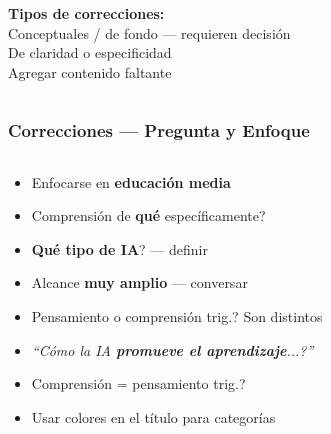 \documentclass[11pt, aspectratio=169, spanish]{beamer}
\newcommand{\semOK}{\textcolor{VerdeOk}{\faCheckCircle}}
\newcommand{\semWA}{\textcolor{AmarilloAv}{\faExclamationCircle}}
\newcommand{\semNO}{\textcolor{RojoAlerta}{\faTimesCircle}}
\begin{document}
\begin{frame}[plain]
\begin{columns}[T]
\vspace{0.12cm}

\begin{tcolorbox}[colback=AzulInfo!7, colframe=AzulInfo!50, arc=2mm]
{\footnotesize\faLightbulb\quad\textbf{Tipos de correcciones:}\\[0.06cm]
\semNO\; {\small Conceptuales / de fondo — requieren decisión}\\
\semWA\; {\small De claridad o especificidad}\\
\semOK\; {\small Agregar contenido faltante}}
\end{tcolorbox}

\end{columns}
\end{frame}

\begin{frame}[plain]
\frametitle{\faFire\quad Correcciones — Pregunta y Enfoque}
\vspace{0pt}

\begin{columns}[T]

\begin{tcolorbox}[colback=RojoAlerta!5, colframe=RojoAlerta!55, arc=2mm,
  nobeforeafter, top=2pt, bottom=2pt,
  title={\footnotesize\textbf{Comentarios de la Dra. Santacruz}}]
{\scriptsize
\begin{itemize}[leftmargin=*, itemsep=1pt]
  \item \colorbox{RojoAlerta!15}{\textcolor{RojoAlerta}{}}\; Enfocarse en \textbf{educación media}
  \item \colorbox{RojoAlerta!15}{\textcolor{RojoAlerta}{}}\; \textquestiondown{}Comprensión de \textbf{qué} específicamente?
  \item \colorbox{RojoAlerta!15}{\textcolor{RojoAlerta}{}}\; \textquestiondown{}\textbf{Qué tipo de IA}? — definir
  \item \colorbox{RojoAlerta!15}{\textcolor{RojoAlerta}{}}\; Alcance \textbf{muy amplio} — conversar
  \item \colorbox{RojoAlerta!15}{\textcolor{RojoAlerta}{}}\; \textquestiondown{}Pensamiento o comprensión trig.? Son distintos
  \item \colorbox{RojoAlerta!15}{\textcolor{RojoAlerta}{}}\; \textit{``\textquestiondown{}Cómo la IA \textbf{promueve el aprendizaje}...?''}
  \item \colorbox{RojoAlerta!15}{\textcolor{RojoAlerta}{}}\; \textquestiondown{}Comprensión = pensamiento trig.?
  \item \colorbox{RojoAlerta!15}{\textcolor{RojoAlerta}{}}\; Usar colores en el título para categorías
\end{itemize}}
\end{tcolorbox}


\end{columns}
\end{frame}
\end{document}
